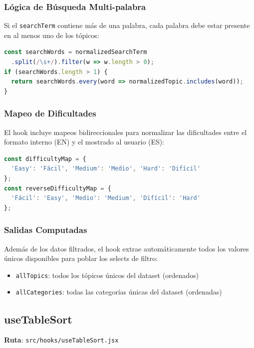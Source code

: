 \documentclass[12pt,a4paper]{article}
\begin{document}
\subsubsection{Lógica de Búsqueda Multi-palabra}

Si el \texttt{searchTerm} contiene más de una palabra, cada palabra debe estar presente en al menos uno de los tópicos:

\begin{lstlisting}[language=JavaScript]
const searchWords = normalizedSearchTerm
  .split(/\s+/).filter(w => w.length > 0);
if (searchWords.length > 1) {
  return searchWords.every(word => normalizedTopic.includes(word));
}
\end{lstlisting}

\subsubsection{Mapeo de Dificultades}

El hook incluye mapeos bidireccionales para normalizar las dificultades entre el formato interno (EN) y el mostrado al usuario (ES):

\begin{lstlisting}[language=JavaScript]
const difficultyMap = {
  'Easy': 'Fácil', 'Medium': 'Medio', 'Hard': 'Difícil'
};
const reverseDifficultyMap = {
  'Fácil': 'Easy', 'Medio': 'Medium', 'Difícil': 'Hard'
};
\end{lstlisting}

\subsubsection{Salidas Computadas}

Además de los datos filtrados, el hook extrae automáticamente todos los valores únicos disponibles para poblar los selects de filtro:
\begin{itemize}
  \item \texttt{allTopics}: todos los tópicos únicos del dataset (ordenados)
  \item \texttt{allCategories}: todas las categorías únicas del dataset (ordenadas)
\end{itemize}

\subsection{useTableSort}

\textbf{Ruta}: \texttt{src/hooks/useTableSort.jsx}
\end{document}
